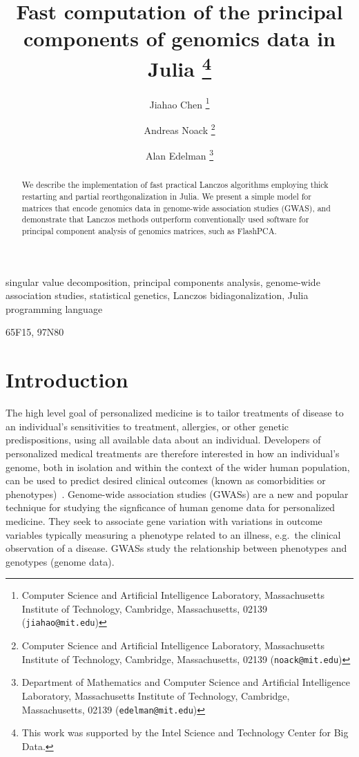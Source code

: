 \documentclass[final,leqno]{siamltex1213}
\title{Fast computation of the principal components of genomics data in Julia
    \thanks{This
        work was supported by the Intel Science and Technology Center for Big Data.
	}}
\author{%
    Jiahao Chen
    \thanks{Computer Science and Artificial Intelligence Laboratory,
           Massachusetts Institute of Technology,
           Cambridge, Massachusetts, 02139 ({\tt jiahao@mit.edu})}
    \and
    Andreas Noack
    \thanks{Computer Science and Artificial Intelligence Laboratory,
            Massachusetts Institute of Technology,
            Cambridge, Massachusetts, 02139 ({\tt noack@mit.edu})}
    \and
    Alan Edelman
    \thanks{Department of Mathematics and Computer Science and Artificial Intelligence Laboratory,
            Massachusetts Institute of Technology,
            Cambridge, Massachusetts, 02139 ({\tt edelman@mit.edu})}
}
\begin{document}
\maketitle

\begin{abstract}
We describe the implementation of fast practical Lanczos algorithms employing
thick restarting and partial reorthgonalization in Julia. We present a simple
model for matrices that encode genomics data in genome-wide association studies
(GWAS), and demonstrate that Lanczos methods outperform conventionally used
software for principal component analysis of genomics matrices, such as FlashPCA.
\end{abstract}

\begin{keywords}
    singular value decomposition,
    principal components analysis,
    genome-wide association studies,
    statistical genetics,
    Lanczos bidiagonalization,
    Julia programming language
\end{keywords}

\begin{AMS}
    65F15, 97N80
\end{AMS}

\pagestyle{myheadings}
\thispagestyle{plain}

\listoftodos

\section{Introduction}

The high level goal of personalized medicine is to tailor treatments of disease
to an individual's sensitivities to treatment, allergies, or other genetic
predispositions, using all available data about an individual.
Developers of personalized medical treatments are therefore interested in how an
individual's genome, both in isolation and within the context of the wider human
population, can be used to predict desired clinical outcomes (known as
comorbidities or phenotypes)~\cite[Ch. 8]{Laird2011}.
Genome-wide association studies (GWASs) are a new and popular technique for
studying the signficance of human genome data for personalized medicine.
They seek to associate gene variation with variations in outcome variables
typically measuring a phenotype related to an illness, e.g.\ the clinical
observation of a disease. GWASs study the relationship between phenotypes and
genotypes (genome data).
\end{document}
